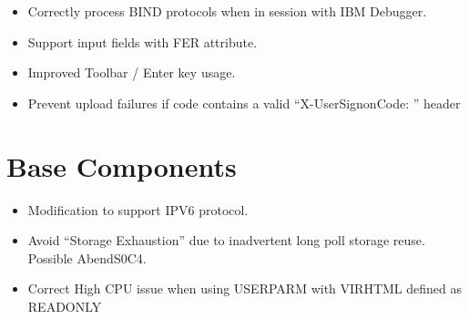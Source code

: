 \documentclass[letterpaper,10pt,english]{sphinxmanual}
\begin{document}
\begin{itemize}
\item {} 
Correctly process BIND protocols when in session with IBM Debugger.

\end{itemize}

\begin{itemize}
\item {} 
Support input fields with FER attribute.

\end{itemize}

\begin{itemize}
\item {} 
Improved Toolbar / Enter key usage.

\end{itemize}

\begin{itemize}
\item {} 
Prevent upload failures if code contains a valid  “X-UserSignonCode: ” header

\end{itemize}

\newpage


\section{Base Components}
\label{\detokenize{TN202101:base-components}}
\begin{itemize}
\item {} 
Modification to support IPV6 protocol.

\end{itemize}

\begin{itemize}
\item {} 
Avoid “Storage Exhaustion” due to inadvertent long poll storage reuse. Possible AbendS0C4.

\end{itemize}

\begin{itemize}
\item {} 
Correct High CPU issue when using USERPARM with VIRHTML defined as READONLY

\end{itemize}
\end{document}
